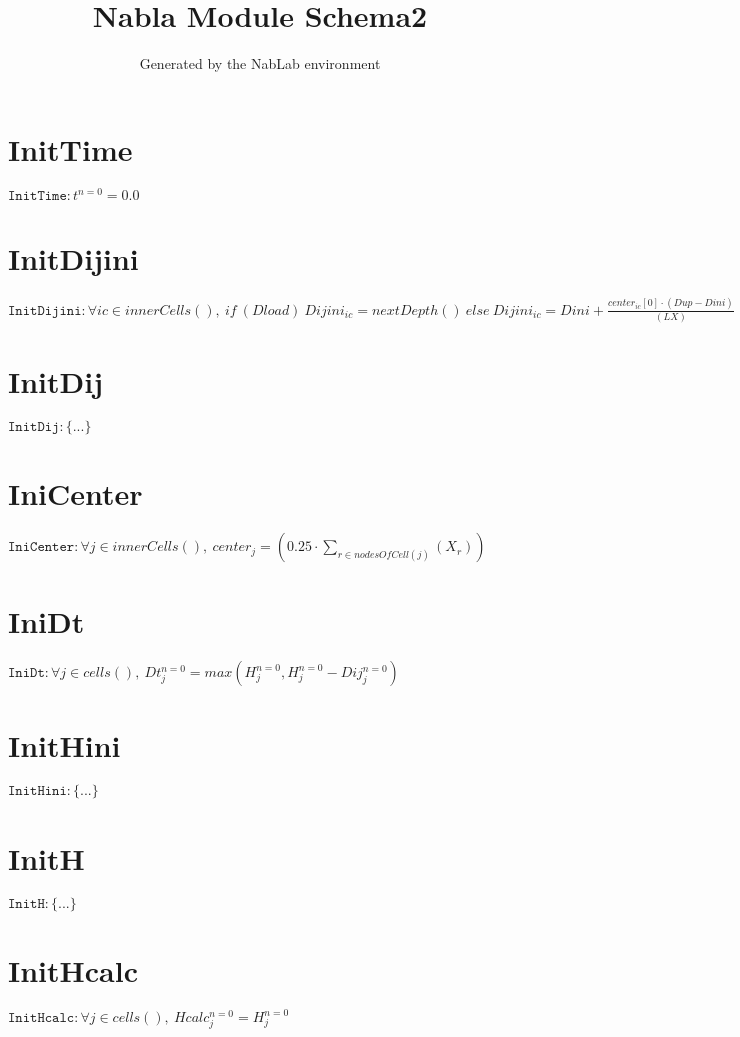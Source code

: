 \documentclass[11pt]{article}
\title{Nabla Module Schema2}
\author{Generated by the NabLab environment}
\begin{document}
\maketitle


\section{InitTime}
$\texttt{InitTime} : t^{n=0} = 0.0$


\section{InitDijini}
$\texttt{InitDijini} : \forall{ic\in innerCells()}, \ if~\left(Dload\right)~Dijini_{ic} = nextDepth\left(\right)~else~Dijini_{ic} = Dini + \frac{center_{ic}\left[0\right] \cdot (Dup - Dini)}{(LX)}$


\section{InitDij}
$\texttt{InitDij} : \{ ... \}$


\section{IniCenter}
$\texttt{IniCenter} : \forall{j\in innerCells()}, \ center_{j} = (0.25 \cdot \sum_{r\in nodesOfCell(j)}\left(X_{r}\right))$


\section{IniDt}
$\texttt{IniDt} : \forall{j\in cells()}, \ Dt^{n=0}_{j} = max\left(H^{n=0}_{j},H^{n=0}_{j} - Dij^{n=0}_{j}\right)$


\section{InitHini}
$\texttt{InitHini} : \{ ... \}$


\section{InitH}
$\texttt{InitH} : \{ ... \}$


\section{InitHcalc}
$\texttt{InitHcalc} : \forall{j\in cells()}, \ Hcalc^{n=0}_{j} = H^{n=0}_{j}$
\end{document}
